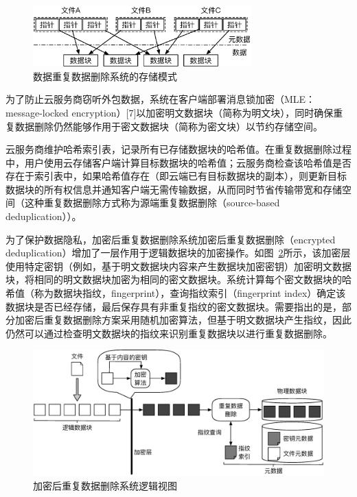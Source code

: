 \begin{figure}[!htb]
    \small
    \centering
    \includegraphics[width=0.75\textwidth]{pic/DedupSystemStorageMode.eps}
    \caption{数据重复数据删除系统的存储模式} 
    \label{fig:Deduplication-storage-pattern}
\end{figure} 


为了防止云服务商窃听外包数据，系统在客户端部署消息锁加密（MLE：message-locked encryption）[7]以加密明文数据块（简称为明文块），同时确保重复数据删除仍然能够作用于密文数据块（简称为密文块）以节约存储空间。


云服务商维护哈希索引表，记录所有已存储数据块的哈希值。在重复数据删除过程中，用户使用云存储客户端计算目标数据块的哈希值；云服务商检查该哈希值是否存在于索引表中，如果哈希值存在（即云端已有目标数据块的副本），则更新目标数据块的所有权信息并通知客户端无需传输数据，从而同时节省传输带宽和存储空间（这种重复数据删除方式称为源端重复数据删除（source-based deduplication））。



为了保护数据隐私，加密后重复数据删除系统加密后重复数据删除（encrypted deduplication）增加了一层作用于逻辑数据块的加密操作。如图~\ref{fig:Encrypted-deduplication-storage-logic}所示，该加密层使用特定密钥（例如，基于明文数据块内容来产生数据块加密密钥\cite{bellare2013message}）加密明文数据块，将相同的明文数据块加密为相同的密文数据块。系统计算每个密文数据块的哈希值（称为数据块指纹，fingerprint），查询指纹索引（fingerprint index）确定该数据块是否已经存储，最后保存具有非重复指纹的密文数据块。需要指出的是，部分加密后重复数据删除方案\cite{bellare2013message}采用随机加密算法，但基于明文数据块产生指纹，因此仍然可以通过检查明文数据块的指纹来识别重复数据块以进行重复数据删除。

\begin{figure}[!htb]
    \small
    \centering
    \includegraphics[width=\textwidth]{pic/EncryptDedupSystemLogic.eps}
    \caption{加密后重复数据删除系统逻辑视图}
    \label{fig:Encrypted-deduplication-storage-logic}
\end{figure}


